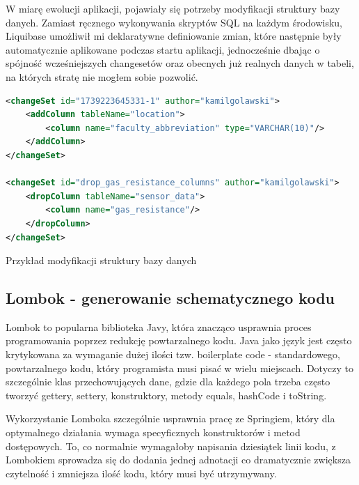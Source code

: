 \documentclass[a4paper,12pt,openany]{book}
\begin{document}
W miarę ewolucji aplikacji, pojawiały się potrzeby modyfikacji struktury bazy danych. Zamiast ręcznego wykonywania skryptów SQL na każdym środowisku, Liquibase umożliwił mi deklaratywne definiowanie zmian, które następnie były automatycznie aplikowane podczas startu aplikacji, jednocześnie dbając o spójność wcześniejszych changesetów oraz obecnych już realnych danych w tabeli, na których stratę nie mogłem sobie pozwolić.

\begin{lstfloat}[htbp]
\begin{lstlisting}[language=xml]
<changeSet id="1739223645331-1" author="kamilgolawski">
    <addColumn tableName="location">
        <column name="faculty_abbreviation" type="VARCHAR(10)"/>
    </addColumn>
</changeSet>

<changeSet id="drop_gas_resistance_columns" author="kamilgolawski">
    <dropColumn tableName="sensor_data">
        <column name="gas_resistance"/>
    </dropColumn>
</changeSet>
\end{lstlisting}
\caption{Przykład modyfikacji struktury bazy danych}
\label{lst:liquibase-modify}
\end{lstfloat}

\vspace{2cm}

\subsection*{Lombok - generowanie schematycznego kodu}

Lombok to popularna biblioteka Javy, która znacząco usprawnia proces programowania poprzez redukcję powtarzalnego kodu. Java jako język jest często krytykowana za wymaganie dużej ilości tzw. boilerplate code - standardowego, powtarzalnego kodu, który programista musi pisać w wielu miejscach. Dotyczy to szczególnie klas przechowujących dane, gdzie dla każdego pola trzeba często tworzyć gettery, settery, konstruktory, metody equals, hashCode i toString.

Wykorzystanie Lomboka szczególnie usprawnia pracę ze Springiem, który dla optymalnego działania wymaga specyficznych konstruktorów i metod dostępowych. To, co normalnie wymagałoby napisania dziesiątek linii kodu, z Lombokiem sprowadza się do dodania jednej adnotacji co dramatycznie zwiększa czytelność i zmniejsza ilość kodu, który musi być utrzymywany.
\end{document}
